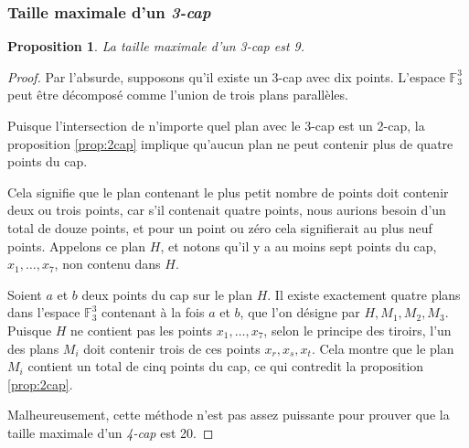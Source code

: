 \documentclass[a4paper,12pt,titlepage]{article}
\theoremstyle{plain}
\newtheorem{prop}{Proposition}
\theoremstyle{definition}
\newcommand{\Ftrois}[1]{\mathbb{F}^#1_3}
\begin{document}
\subsubsection{Taille maximale d'un \emph{3-cap}}
\begin{prop} \label{prop:3cap}
  La taille maximale d'un \emph{3-cap} est 9.
\end{prop}
\begin{proof}
  Par l'absurde, supposons qu'il existe un 3-cap avec dix points. L'espace $\Ftrois{3}$ peut être décomposé comme l'union de trois plans parallèles.

  Puisque l'intersection de n'importe quel plan avec le 3-cap est un 2-cap, la proposition \ref{prop:2cap} implique qu'aucun plan ne peut contenir plus de quatre points du cap.
  
  Cela signifie que le plan contenant le plus petit nombre de points doit contenir deux ou trois points, car s'il contenait quatre points, nous aurions besoin d'un total de douze points, et pour un point ou zéro cela signifierait au plus neuf points. Appelons  ce plan $H$, et notons qu’il y a au moins sept points du cap, $x_1,\dots ,x_7$, non contenu dans $H$.
  
  Soient $a$ et $b$ deux points du cap sur le plan $H$. Il existe exactement quatre plans dans l'espace $\Ftrois{3}$ contenant à la fois $a$ et $b$, que l'on désigne par $H, M_1, M_2, M_3$. Puisque $H$ ne contient pas les points $x_1,\dots ,x_7$, selon le principe des tiroirs, l'un des plans $M_i$ doit contenir trois de ces points $x_r, x_s, x_t$. Cela montre que le plan $M_i$ contient un total de cinq points du cap, ce qui contredit la proposition \ref{prop:2cap}.

  
  Malheureusement, cette méthode n'est pas assez puissante pour prouver que la taille maximale d'un \emph{4-cap} est 20.
\end{proof}
\end{document}
